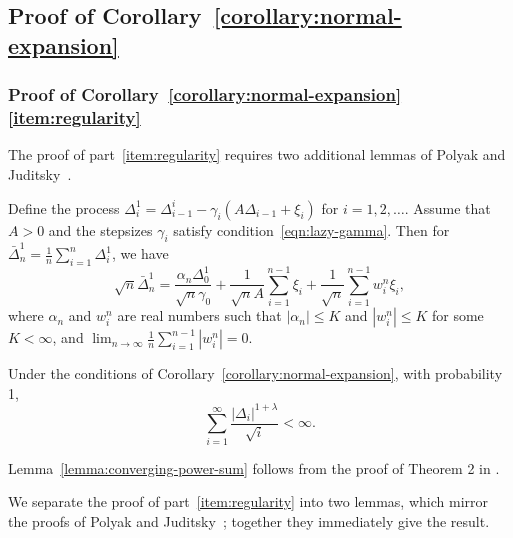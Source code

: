 \subsection{Proof of Corollary~\ref{corollary:normal-expansion}}
\label{proof:normal-expansion}

\subsubsection*{Proof of
  Corollary~\ref{corollary:normal-expansion}\eqref{item:regularity}}

The proof of part~\eqref{item:regularity} requires two additional lemmas of
Polyak and Juditsky~\cite{PolyakJu92}.
\begin{lem}
  \label{lemma:polyak-expansion}
  Define the process $\Delta_i^1 = \Delta_{i-1}^i
  - \gamma_i (A \Delta_{i-1} + \xi_i)$ for $i = 1, 2, \ldots$.
  Assume that $A>0$ and the stepsizes $\gamma_i$ satisfy
  condition~\eqref{eqn:lazy-gamma}. Then
  for $\bar{\Delta}_n^1 = \frac{1}{n} \sum_{i = 1}^n \Delta_i^1$, we have
  \begin{equation}
    \label{eqn:polyak-expansion}
    \sqrt{n} \bar{\Delta}_n^1
    = \frac{\alpha_n \Delta_0^1}{\sqrt{n} \gamma_0}
    + \frac{1}{\sqrt{n} A} \sum_{i=1}^{n-1} \xi_i
    + \frac{1}{\sqrt{n}}\sum_{i=1}^{n-1} w_i^n \xi_i,
  \end{equation}
  where $\alpha_n$ and $w_i^n$ are real numbers such that $|\alpha_n| \leq
  K$ and $|w_i^n|\leq K$ for some $K< \infty$, and $\lim_{n\to \infty}
  \frac{1}{n} \sum_{i=1}^{n-1} |w_i^n| = 0$.
\end{lem} 

\begin{lem}
  \label{lemma:converging-power-sum}
  Under the conditions of Corollary~\ref{corollary:normal-expansion},
  with probability 1,
  \begin{equation*}
  \sum_{i=1}^\infty \frac{|\Delta_{i}|^{1+\lambda}}{\sqrt{i}} < \infty.
  \end{equation*}
\end{lem}
\noindent
Lemma~\ref{lemma:converging-power-sum} follows from the proof of Theorem 2
in \cite[page 851]{polyak1992acceleration}.

We separate the proof of part~\eqref{item:regularity} into two lemmas, which
mirror the proofs of Polyak and Juditsky~\cite{PolyakJu92}; together they
immediately give the result.

